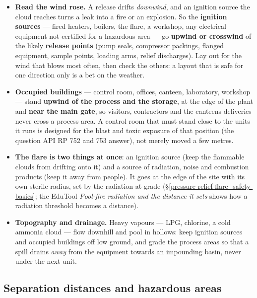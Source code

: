 \documentclass[11pt,a4paper]{article}
\providecommand{\tightlist}{\setlength{\itemsep}{0pt}\setlength{\parskip}{0pt}}
\begin{document}
\begin{itemize}
\tightlist
\item
  \textbf{Read the wind rose.} A release drifts \emph{downwind}, and an
  ignition source the cloud reaches turns a leak into a fire or an
  explosion. So the \textbf{ignition sources} --- fired heaters, boilers,
  the flare, a workshop, any electrical equipment not certified for a
  hazardous area --- go \textbf{upwind or crosswind} of the likely
  \textbf{release points} (pump seals, compressor packings, flanged
  equipment, sample points, loading arms, relief discharges). Lay out for
  the wind that blows most often, then check the others: a layout that
  is safe for one direction only is a bet on the weather.
\item
  \textbf{Occupied buildings} --- control room, offices, canteen,
  laboratory, workshop --- stand \textbf{upwind of the process and the
  storage}, at the edge of the plant and \textbf{near the main gate}, so
  visitors, contractors and the canteen\textquotesingle s deliveries
  never cross a process area. A control room that must stand close to
  the units it runs is designed for the blast and toxic exposure of that
  position (the question API RP 752 and 753 answer), not merely moved a
  few metres.
\item
  \textbf{The flare is two things at once}: an ignition source (keep the
  flammable clouds from drifting onto it) and a source of radiation,
  noise and combustion products (keep it away from people). It goes at
  the edge of the site with its own sterile radius, set by the radiation
  at grade (\S\ref{pressure-relief-flare--safety-basics}; the EduTool
  \emph{Pool-fire radiation and the distance it sets} shows how a
  radiation threshold becomes a distance).
\item
  \textbf{Topography and drainage.} Heavy vapours --- LPG, chlorine, a
  cold ammonia cloud --- flow downhill and pool in hollows: keep ignition
  sources and occupied buildings off low ground, and grade the process
  areas so that a spill drains \emph{away} from the equipment towards an
  impounding basin, never under the next unit.
\end{itemize}

\hypertarget{separation-distances-and-hazardous-areas}{%
\subsection{Separation distances and hazardous
areas}\label{separation-distances-and-hazardous-areas}}
\end{document}
